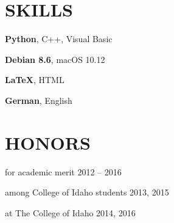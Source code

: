 \documentclass[margin]{res}
\begin{document}
\begin{resume}
\section{SKILLS} \vspace{0pt}
\begin{multicols}{2} \parskip=0pt

    \begin{details}
    \item \textbf{Python}, C++, Visual Basic
    \end{details}
    
    \begin{details}
    \item \textbf{Debian 8.6}, macOS 10.12
    \end{details}    
        
    \begin{details}
    \item \textbf{\LaTeX}, HTML
    \end{details}

    \begin{details}
    \item \textbf{German}, English
    \end{details}

\end{multicols}

\section{HONORS} \vspace{10pt}

\begin{description}[noitemsep,topsep=0pt]
        \item[Heritage Scholarship] for academic merit \hfill 2012 -- 2016
    	\item[Top Putnam Score] among College of Idaho students \hfill 2013, 2015
        \item[Varsity Skier] at The College of Idaho \hfill 2014, 2016
\end{description}

\end{resume}
\end{document}
